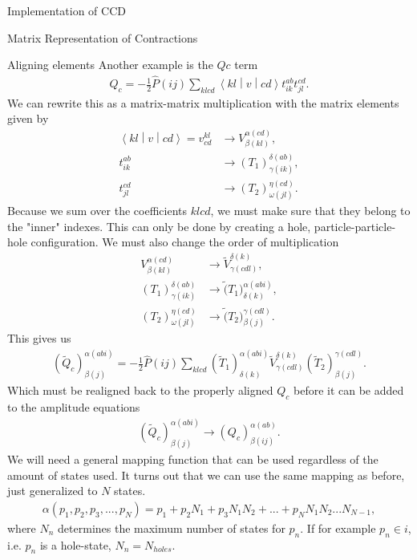 \documentclass[twoside,english]{uiofysmaster}
\begin{document}
\begin{chapter}{Implementation of CCD}
\begin{section}{Matrix Representation of Contractions}
\begin{subsection}{Aligning elements}
			Another example is the $Qc$ term
			\begin{align}
				Q_c = -\frac{1}{2} \hat P(ij) \sum_{klcd} \left< kl \middle| v \middle| cd \right> t_{ik}^{ab} t_{jl}^{cd}.
			\end{align}
			We can rewrite this as a matrix-matrix
                        multiplication with the matrix elements given
                        by
			\begin{align}
				\left< kl \middle| v \middle| cd \right> = v_{cd}^{kl} & \rightarrow V^{\alpha(cd)}_{\beta(kl)}, \\
				t_{ik}^{ab} & \rightarrow (T_1)_{\gamma(ik)}^{\delta(ab)}, \\
				t_{jl}^{cd} & \rightarrow (T_2)_{\omega(jl)}^{\eta(cd)}.
			\end{align}
			Because we sum over the coefficients $klcd$,
                        we must make sure that they belong to the
                        "inner" indexes. This can only be done by
                        creating a hole, particle-particle-hole
                        configuration. We must also change the order
                        of multiplication
			\begin{align}
				V^{\alpha(cd)}_{\beta(kl)} &  \rightarrow \tilde V^{\delta(k)}_{\gamma(cdl)}, \\
				(T_1)_{\gamma(ik)}^{\delta(ab)} & \rightarrow \tilde (T_1)^{\alpha(abi)}_{\delta(k)}, \\
				(T_2)_{\omega(jl)}^{\eta(cd)} & \rightarrow \tilde (T_2)^{\gamma(cdl)}_{\beta(j)}.
			\end{align}
			This gives us
			\begin{align}
				( \tilde Q_c )_{\beta(j)}^{\alpha(abi)} = -\frac{1}{2} \hat P(ij) \sum_{klcd} (\tilde T_1)^{\alpha(abi)}_{\delta(k)} \tilde V^{\delta(k)}_{\gamma(cdl)} (\tilde T_2)^{\gamma(cdl)}_{\beta(j)}.
			\end{align}
			Which must be realigned back to the properly aligned $Q_c$ before it can be added to the amplitude equations
			\begin{align}
				( \tilde Q_c )_{\beta(j)}^{\alpha(abi)} \rightarrow (Q_c)_{\beta(ij)}^{\alpha(ab)}.
			\end{align}
			We will need a general mapping function that
                        can be used regardless of the amount of states
                        used. It turns out that we can use the same
                        mapping as before, just generalized to $N$
                        states.
			\begin{align}
				\alpha(p_1,p_2,p_3,...,p_N) = p_1 + p_2N_1 + p_3N_1N_2 + ... + p_N N_1 N_2 ... N_{N-1},
			\end{align}
			where $N_n$ determines the maximum number of
                        states for $p_n$. If for example $p_n \in i$,
                        i.e. $p_n$ is a hole-state, $N_n = N_{holes}$.


\end{subsection}
\end{section}
\end{chapter}
\end{document}
